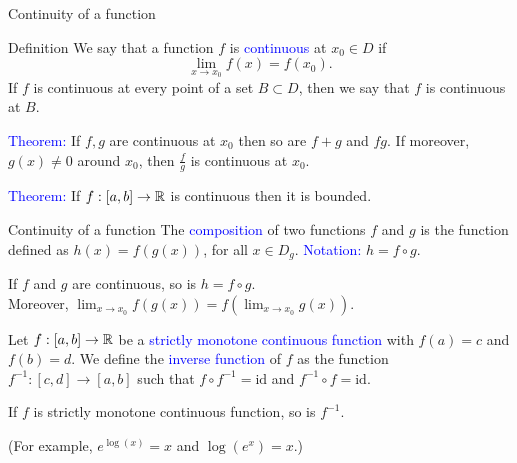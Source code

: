 \documentclass[11pt,aspectratio=169]{beamer}
\begin{document}
\begin{frame}{Continuity of a function}
\begin{alertblock}{Definition}
We say that a function $f$ is \textcolor{blue}{continuous}
at $x_0 \in D$ if $$\lim_{x \rightarrow x_0} f(x)=f(x_0).$$
If $f$ is continuous at every point of a set $B\subset D$, then we say that $f$ is continuous
at $B$.	
\end{alertblock}

\textcolor{blue}{Theorem:} If $f,g$ are continuous at $x_0$ then so are $f+g$ and $f g$. If moreover,
$g(x)\neq 0$ around $x_0$, then $\frac{f}{g}$ is continuous at $x_0$.

\vskip 12pt
\textcolor{blue}{Theorem:} If $f:[a,b] \rightarrow \mathbb R$ is continuous then it is bounded.

\end{frame}


\begin{frame}{Continuity of a function}
The \textcolor{blue}{composition} of two functions $f$ and $g$ is the function  defined as
$h(x)=f(g(x))$, for all $x \in D_g$. 
\textcolor{blue}{Notation:} $h=f \circ g$.
\begin{block}{}
	If $f$ and $g$ are continuous, so is $h=f\circ g$. \\[3mm]
	\qquad Moreover, $\lim_{x\to x_0} f(g(x))=f(\lim_{x\to x_0}g(x))$.
\end{block}


\vskip 12pt
Let $f:[a,b] \rightarrow \mathbb R$ be a \textcolor{blue}{strictly monotone continuous function} with $f(a)=c$ and $f(b)=d$.  We define the \textcolor{blue}{inverse function} of $f$ as the function $f^{-1}:[c,d] \rightarrow [a,b]$ such that $f \circ f^{-1}=\text{id}$ and $f^{-1} \circ f=\text{id}$.
\begin{block}{}
	If $f$ is strictly monotone continuous function, so is $f^{-1}$. 
\end{block}

\begin{tiny} (For example, $e^{\log(x)}=x$ and $\log(e^x)=x$.) \end{tiny}


\end{frame}
\end{document}
